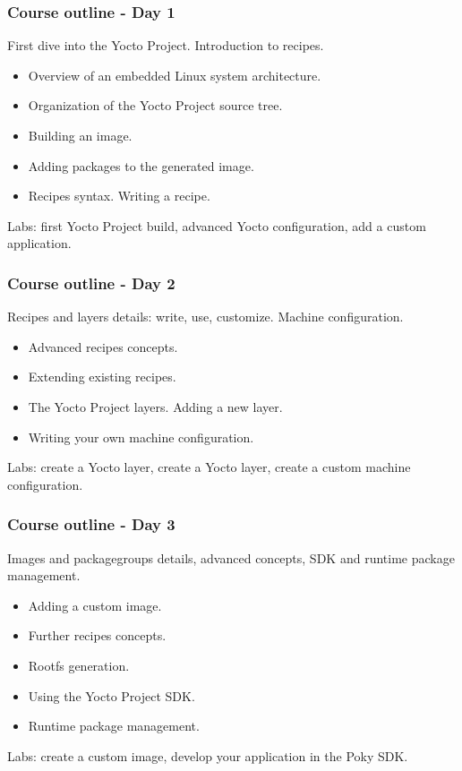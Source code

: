 \begin{frame}
\frametitle{Course outline - Day 1}
First dive into the Yocto Project. Introduction to recipes.
\begin{itemize}
\item Overview of an embedded Linux system architecture.
\item Organization of the Yocto Project source tree.
\item Building an image.
\item Adding packages to the generated image.
\item Recipes syntax. Writing a recipe.
\end{itemize}
Labs: first Yocto Project build, advanced Yocto configuration,
add a custom application.
\end{frame}

\begin{frame}
\frametitle{Course outline - Day 2}
Recipes and layers details: write, use, customize. Machine
configuration.
\begin{itemize}
\item Advanced recipes concepts.
\item Extending existing recipes.
\item The Yocto Project layers. Adding a new layer.
\item Writing your own machine configuration.
\end{itemize}
Labs: create a Yocto layer, create a Yocto layer, create a
custom machine configuration.
\end{frame}

\begin{frame}
\frametitle{Course outline - Day 3}
Images and packagegroups details, advanced concepts, SDK and
runtime package management.
\begin{itemize}
\item Adding a custom image.
\item Further recipes concepts.
\item Rootfs generation.
\item Using the Yocto Project SDK.
\item Runtime package management.
\end{itemize}
Labs: create a custom image, develop your application in
the Poky SDK.
\end{frame}
